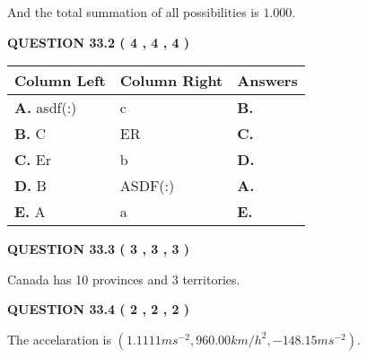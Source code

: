 \documentclass[12pt]{article}
\begin{document}
\noindent
 And the total summation of all possibilities is $  %
1.000 $.
 
 
 
  
\vspace{0.2in}
  
{\textbf{\Large{QUESTION
33.2 
 (           4 ,           4 ,           4 )
}}}
  
  
 
 
\noindent{}
  
  
\begin{tabular}{|l|l|l|}
 \hline
 Column Left & Column Right  & Answers       \\ 
 \hline
{\textbf{\large{
A.}}}
asdf(:)
  & 
c
 & 
{\textbf{\large{
B.}}}
 \\ 
 \hline
{\textbf{\large{
B.}}}
C
  & 
ER
 & 
{\textbf{\large{
C.}}}
 \\ 
 \hline
{\textbf{\large{
C.}}}
Er
  & 
b
 & 
{\textbf{\large{
D.}}}
 \\ 
 \hline
{\textbf{\large{
D.}}}
B
  & 
ASDF(:)
 & 
{\textbf{\large{
A.}}}
 \\ 
 \hline
{\textbf{\large{
E.}}}
A
  & 
a
 & 
{\textbf{\large{
E.}}}
 \\ 
 \hline
 \end{tabular}
  
  
 
 
 
 
  
\vspace{0.2in}
  
{\textbf{\Large{QUESTION
33.3 
 (           3 ,           3 ,           3 )
}}}
  
  
 
 
\noindent{}
 
 
Canada has  %
10 provinces and  %
3 territories.
 
 
 
 
  
\vspace{0.2in}
  
{\textbf{\Large{QUESTION
33.4 
 (           2 ,           2 ,           2 )
}}}
  
  
 
 
\noindent{}
 
 
The accelaration is
$(
1.1111ms^{-2},
960.00km/h^2,
-148.15ms^{-2}
).
$
 
\end{document}
